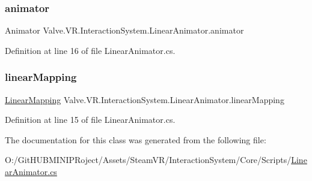 \subsubsection{\texorpdfstring{animator}{animator}}
{\footnotesize\ttfamily Animator Valve.\+V\+R.\+Interaction\+System.\+Linear\+Animator.\+animator}



Definition at line 16 of file Linear\+Animator.\+cs.

\mbox{\label{class_valve_1_1_v_r_1_1_interaction_system_1_1_linear_animator_a9cadae94a7a0fafd30e5106aa2109c2c}} 
\subsubsection{\texorpdfstring{linearMapping}{linearMapping}}
{\footnotesize\ttfamily \mbox{\hyperlink{class_valve_1_1_v_r_1_1_interaction_system_1_1_linear_mapping}{Linear\+Mapping}} Valve.\+V\+R.\+Interaction\+System.\+Linear\+Animator.\+linear\+Mapping}



Definition at line 15 of file Linear\+Animator.\+cs.



The documentation for this class was generated from the following file\+:\begin{DoxyCompactItemize}
\item 
O\+:/\+Git\+H\+U\+B\+M\+I\+N\+I\+P\+Roject/\+Assets/\+Steam\+V\+R/\+Interaction\+System/\+Core/\+Scripts/\mbox{\hyperlink{_linear_animator_8cs}{Linear\+Animator.\+cs}}\end{DoxyCompactItemize}
